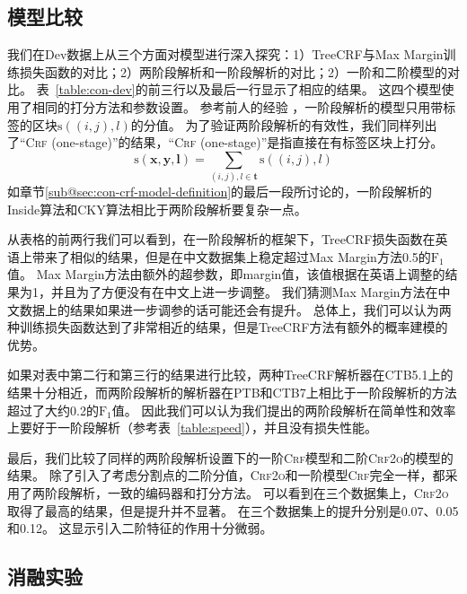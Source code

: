 

\subsection{模型比较}

我们在Dev数据上从三个方面对模型进行深入探究：1）TreeCRF与Max Margin训练损失函数的对比；2）两阶段解析和一阶段解析的对比；2）一阶和二阶模型的对比。
表~\ref{table:con-dev}的前三行以及最后一行显示了相应的结果。
这四个模型使用了相同的打分方法和参数设置。
参考前人的经验 \citep{stern-etal-2017-minimal}，一阶段解析的模型只用带标签的区块$\mathrm{s}((i,j),l)$的分值。
为了验证两阶段解析的有效性，我们同样列出了``\textsc{Crf} (one-stage)''的结果，``\textsc{Crf} (one-stage)''是指直接在有标签区块上打分。
\begin{equation} \label{eq:tree-label-score}
	\mathrm{s}(\boldsymbol{x},\boldsymbol{y},\boldsymbol{l}) =
	\sum_{(i,j),l \in \boldsymbol{t}} \mathrm{s}((i,j),l)
\end{equation}
如章节\ref{sub@sec:con-crf-model-definition}的最后一段所讨论的，一阶段解析的Inside算法和CKY算法相比于两阶段解析要复杂一点。

从表格的前两行我们可以看到，在一阶段解析的框架下，TreeCRF损失函数在英语上带来了相似的结果，但是在中文数据集上稳定超过Max Margin方法0.5的$\mathrm{F}_1$值。
Max Margin方法由额外的超参数，即margin值，该值根据在英语上调整的结果为1，并且为了方便没有在中文上进一步调整。
我们猜测Max Margin方法在中文数据上的结果如果进一步调参的话可能还会有提升。
总体上，我们可以认为两种训练损失函数达到了非常相近的结果，但是TreeCRF方法有额外的概率建模的优势。

如果对表中第二行和第三行的结果进行比较，两种TreeCRF解析器在CTB5.1上的结果十分相近，而两阶段解析的解析器在PTB和CTB7上相比于一阶段解析的方法超过了大约0.2的$\mathrm{F}_1$值。
因此我们可以认为我们提出的两阶段解析在简单性和效率上要好于一阶段解析（参考表~\ref{table:speed}），并且没有损失性能。

最后，我们比较了同样的两阶段解析设置下的一阶\textsc{Crf}模型和二阶\textsc{Crf2o}的模型的结果。
除了引入了考虑分割点的二阶分值，\textsc{Crf2o}和一阶模型\textsc{Crf}完全一样，都采用了两阶段解析，一致的编码器和打分方法。
可以看到在三个数据集上，\textsc{Crf2o}取得了最高的结果，但是提升并不显著。
在三个数据集上的提升分别是0.07、0.05和0.12。
这显示引入二阶特征的作用十分微弱。

\subsection{消融实验}

